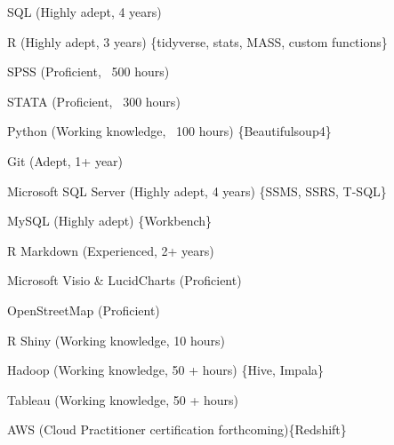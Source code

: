 

\cvsubsection{ }

\begin{cvitems} %
        \item {SQL (Highly adept, 4 years)}
        \item {R (Highly adept, 3 years) \{tidyverse, stats, MASS, custom functions\}}
        \item {SPSS (Proficient, ~500 hours)}
        \item {STATA (Proficient, ~300 hours)}
        \item {Python (Working knowledge, ~100 hours) \{Beautifulsoup4\}}
\end{cvitems}

\cvsubsection{ }


\cvsubsection{ }

\begin{cvitems} %
        \item {Git (Adept, 1+ year)}
        \item {Microsoft SQL Server (Highly adept, 4 years) \{SSMS, SSRS, T-SQL\}}
        \item {MySQL (Highly adept) \{Workbench\}}
        \item {R Markdown (Experienced, 2+ years)}
        \item {Microsoft Visio \& LucidCharts (Proficient)}
        \item {OpenStreetMap (Proficient)}
        \item {R Shiny (Working knowledge, 10 hours)}
        \item {Hadoop (Working knowledge, 50 + hours) \{Hive, Impala\}}
        \item {Tableau (Working knowledge, 50 + hours)}
        \item {AWS (Cloud Practitioner certification forthcoming)\{Redshift\}}
\end{cvitems}

\cvsubsection{ }



